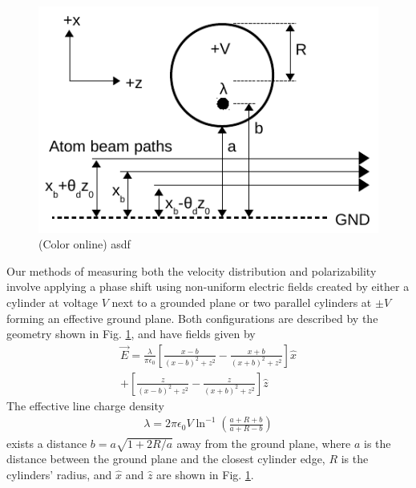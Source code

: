 \documentclass[twocolumn, prl,showpacs,superscriptaddress]{revtex4-1}   %
\newcommand{\figref}[1]{Fig. \ref{#1}}
\begin{document}
\begin{figure}
\includegraphics[width=\linewidth,keepaspectratio]{EDiagram1.pdf}
\caption{\label{EDiagram}(Color online) asdf}
\end{figure}

Our methods of measuring both the velocity distribution and polarizability involve applying a phase shift using non-uniform electric fields created by either a cylinder at voltage $V$ next to a grounded plane or two parallel cylinders at $\pm V$ forming an effective ground plane. 
Both configurations are described by the geometry shown in \figref{EDiagram}, and have fields given by
\begin{align}
	\vec{E} = \frac{\lambda}{\pi\epsilon_0}
	\left[	
		\frac{x-b}{(x-b)^2+z^2} - \frac{x+b}{(x+b)^2+z^2}
	\right] \hat{x} \nonumber \\
	+ 
	\left[	
		\frac{z}{(x-b)^2+z^2} - \frac{z}{(x+b)^2+z^2}
	\right] \hat{z}
	\label{EPillars}
\end{align}
The effective line charge density
\begin{align}
	\lambda = 2\pi\epsilon_0V\ln^{-1}
	\left(
		\frac{a+R+b}{a+R-b}
	\right)
	\label{lambda}
\end{align}
exists a distance $b = a\sqrt{1+2R/a}$ away from the ground plane, where $a$ is the distance between the ground plane and the closest cylinder edge, $R$ is the cylinders' radius, and $\hat{x}$ and $\hat{z}$ are shown in \figref{EDiagram}.
\end{document}
